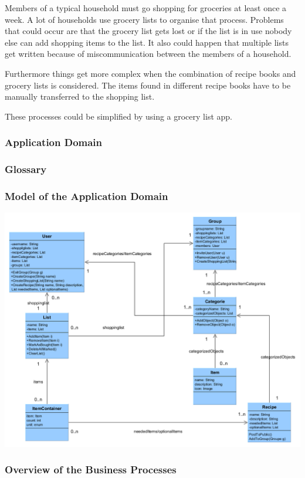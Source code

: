 \documentclass[12pt]{article}
\theoremstyle{definition}
\begin{document}
Members of a typical household must go shopping for groceries at least once a week. A lot of households use grocery lists to organise that process. Problems that could occur are that the grocery list gets lost or if the list is in use nobody else can add shopping items to the list. It also could happen that multiple lists get written because of miscommunication between the members of a household.

Furthermore things get more complex when the combination of recipe books and grocery lists is considered. The items found in different recipe books have to be manually transferred to the shopping list. 

These processes could be simplified by using a grocery list app.

\subsubsection{Application Domain}

\subsubsection{Glossary}

\subsubsection{Model of the Application Domain}

\includegraphics[scale=.5]{UMLClassDiagram.png}

\subsubsection{Overview of the Business Processes}
\end{document}
